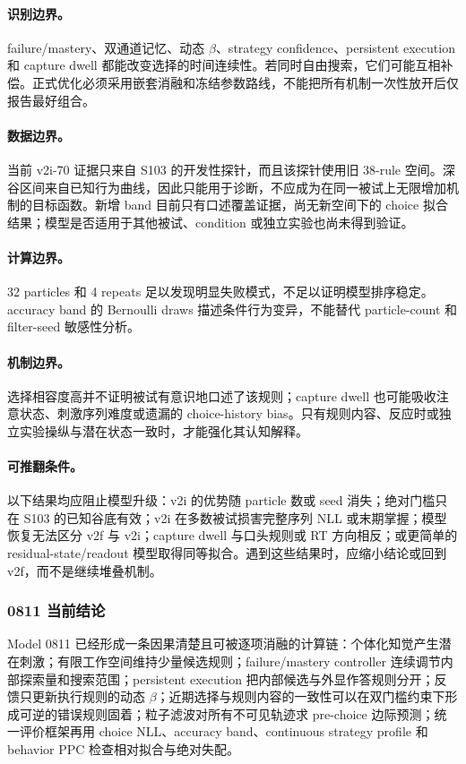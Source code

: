 \paragraph{识别边界。}
failure/mastery、双通道记忆、动态 $\beta$、strategy confidence、persistent execution 和 capture dwell 都能改变选择的时间连续性。若同时自由搜索，它们可能互相补偿。正式优化必须采用嵌套消融和冻结参数路线，不能把所有机制一次性放开后仅报告最好组合。

\paragraph{数据边界。}
当前 v2i-70 证据只来自 S103 的开发性探针，而且该探针使用旧 38-rule 空间。深谷区间来自已知行为曲线，因此只能用于诊断，不应成为在同一被试上无限增加机制的目标函数。新增 band 目前只有口述覆盖证据，尚无新空间下的 choice 拟合结果；模型是否适用于其他被试、condition 或独立实验也尚未得到验证。

\paragraph{计算边界。}
32 particles 和 4 repeats 足以发现明显失败模式，不足以证明模型排序稳定。accuracy band 的 Bernoulli draws 描述条件行为变异，不能替代 particle-count 和 filter-seed 敏感性分析。

\paragraph{机制边界。}
选择相容度高并不证明被试有意识地口述了该规则；capture dwell 也可能吸收注意状态、刺激序列难度或遗漏的 choice-history bias。只有规则内容、反应时或独立实验操纵与潜在状态一致时，才能强化其认知解释。

\paragraph{可推翻条件。}
以下结果均应阻止模型升级：v2i 的优势随 particle 数或 seed 消失；绝对门槛只在 S103 的已知谷底有效；v2i 在多数被试损害完整序列 NLL 或末期掌握；模型恢复无法区分 v2f 与 v2i；capture dwell 与口头规则或 RT 方向相反；或更简单的 residual-state/readout 模型取得同等拟合。遇到这些结果时，应缩小结论或回到 v2f，而不是继续堆叠机制。


\subsubsection{0811 当前结论}

Model 0811 已经形成一条因果清楚且可被逐项消融的计算链：个体化知觉产生潜在刺激；有限工作空间维持少量候选规则；failure/mastery controller 连续调节内部探索量和搜索范围；persistent execution 把内部候选与外显作答规则分开；反馈只更新执行规则的动态 $\beta$；近期选择与规则内容的一致性可以在双门槛约束下形成可逆的错误规则固着；粒子滤波对所有不可见轨迹求 pre-choice 边际预测；统一评价框架再用 choice NLL、accuracy band、continuous strategy profile 和 behavior PPC 检查相对拟合与绝对失配。

